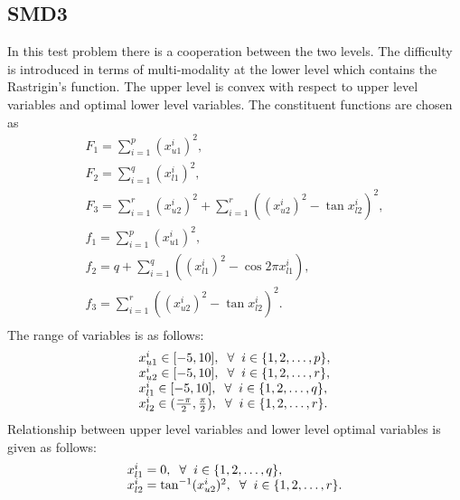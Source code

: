 \documentclass[twoside]{article}
\begin{document}
\subsection{SMD3}
In this test problem there is a cooperation between the two levels. The difficulty is introduced in terms of multi-modality at the lower level which contains the Rastrigin's function. The upper level is convex with respect to upper level variables and optimal lower level variables. The constituent functions are chosen as
\begin{equation}
\begin{array}{l}
F_1 = \sum_{i=1}^{p} (x_{u1}^{i})^2,\\
F_2 = \sum_{i=1}^{q} (x_{l1}^{i})^2,\\
F_3 = \sum_{i=1}^{r} (x_{u2}^{i})^2 + \sum_{i=1}^{r} ((x_{u2}^{i})^2 - \tan x_{l2}^{i})^2,\\
f_1 = \sum_{i=1}^{p} (x_{u1}^{i})^2,\\
f_2 = q + \sum_{i=1}^{q} \left(\left(x_{l1}^{i}\right)^2 - \cos 2\pi x_{l1}^{i}\right),\\
f_3 = \sum_{i=1}^{r} ((x_{u2}^{i})^2 - \tan x_{l2}^{i})^2.\\
\end{array}
\end{equation}
The range of variables is as follows:
\begin{equation}
\begin{array}{l}
x_{u1}^{i} \in [-5,10], \hspace{2mm} \forall \hspace{2mm} i \in \{1,2,\ldots,p\},\\
x_{u2}^{i} \in [-5,10], \hspace{2mm} \forall \hspace{2mm} i \in \{1,2,\ldots,r\},\\
x_{l1}^{i} \in [-5,10], \hspace{2mm} \forall \hspace{2mm} i \in \{1,2,\ldots,q\},\\
x_{l2}^{i} \in (\frac{-\pi}{2},\frac{\pi}{2}), \hspace{2mm} \forall \hspace{2mm} i \in \{1,2,\ldots,r\}.
\end{array}
\end{equation}
Relationship between upper level variables and lower level optimal variables is given as follows:
\begin{equation}
\begin{array}{l}
x_{l1}^{i} = 0, \hspace{2mm} \forall \hspace{2mm} i \in \{1,2,\ldots,q\},\\
x_{l2}^{i} = \tan^{-1} (x_{u2}^{i})^2, \hspace{2mm} \forall \hspace{2mm} i \in \{1,2,\ldots,r\}.
\end{array}
\end{equation}
\end{document}
